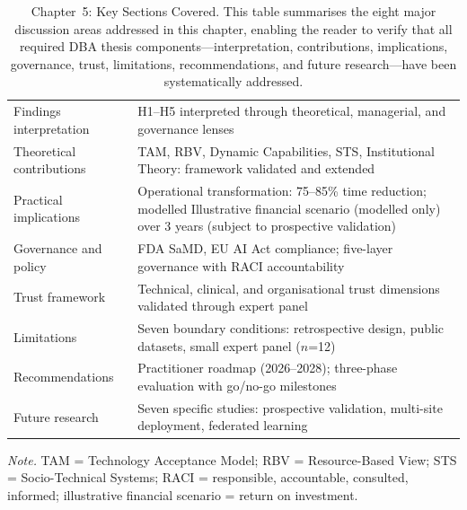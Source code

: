 \begin{table}[H]
\tablestripes\tablefontsize
\tablefontsize
\caption[Chapter 5 sections covered]{Chapter~5: Key Sections Covered. This table summarises the eight major discussion areas addressed in this chapter, enabling the reader to verify that all required DBA thesis components---interpretation, contributions, implications, governance, trust, limitations, recommendations, and future research---have been systematically addressed.}
\begin{tabularx}{\textwidth}{@{} p{4cm} L @{}}
\toprule
{} &  \\
\midrule
Findings interpretation & H1--H5 interpreted through theoretical, managerial, and governance lenses \\
Theoretical contributions & TAM, RBV, Dynamic Capabilities, STS, Institutional Theory: framework validated and extended \\
Practical implications & Operational transformation: 75--85\% time reduction; modelled Illustrative financial scenario (modelled only) over 3 years (subject to prospective validation) \\
Governance and policy & FDA SaMD, EU AI Act compliance; five-layer governance with RACI accountability \\
Trust framework & Technical, clinical, and organisational trust dimensions validated through expert panel \\
Limitations & Seven boundary conditions: retrospective design, public datasets, small expert panel ($n$=12) \\
Recommendations & Practitioner roadmap (2026--2028); three-phase evaluation with go/no-go milestones \\
Future research & Seven specific studies: prospective validation, multi-site deployment, federated learning \\
\bottomrule
\end{tabularx}
\vspace{0.5em}\noindent\textit{Note.} TAM = Technology Acceptance Model; RBV = Resource-Based View; STS = Socio-Technical Systems; RACI = responsible, accountable, consulted, informed; illustrative financial scenario = return on investment.
\end{table}

